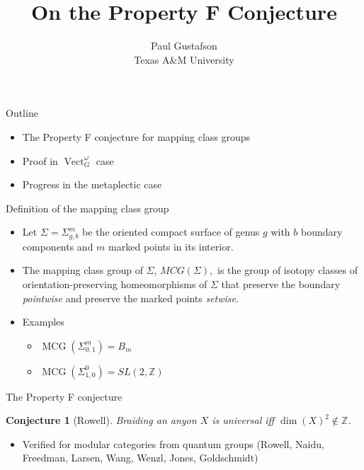\documentclass{beamer}
\title{On the Property F Conjecture}
\date{Paul Gustafson \\ Texas A\&M University}
\DeclareMathOperator{\MCG}{MCG}
\DeclareMathOperator{\Vect}{Vect}
\newtheorem{conj}[theorem]{Conjecture}
\begin{document}
\frame{\titlepage}

\begin{frame}{Outline}
  \begin{itemize}
  \item The Property F conjecture for mapping class groups
  \item Proof in $\Vect_G^\omega$ case
  \item Progress in the metaplectic case
  \end{itemize}
\end{frame}


\begin{frame}{Definition of the mapping class group}
\begin{itemize}
\item
    Let $\Sigma = \Sigma_{g,b}^m$ be the oriented compact surface of genus $g$ with $b$ boundary components and $m$ marked points in its interior.

    \pause
\item
   The mapping class group of $\Sigma$, 
   $MCG(\Sigma),$
   is the group of isotopy classes of orientation-preserving homeomorphisms of $\Sigma$ that preserve the boundary \emph{pointwise} and preserve the marked points \emph{setwise}.

  \item Examples
  \begin{itemize}
    \item $\MCG(\Sigma_{0,1}^m) = B_m$
    \item $\MCG(\Sigma_{1,0}^0) = SL(2,\mathbb Z)$
  \end{itemize}
\end{itemize}
\end{frame}


\begin{frame}{The Property F conjecture}
\begin{conj}[Rowell]
Braiding an anyon $X$ is universal iff $\dim(X)^2 \not\in \mathbb{Z}$.
\end{conj}

\begin{itemize}
\item Verified for modular categories from quantum groups (Rowell, Naidu, Freedman, Larsen, Wang, Wenzl, Jones, Goldschmidt)
\end{itemize}
\end{frame}
\end{document}
